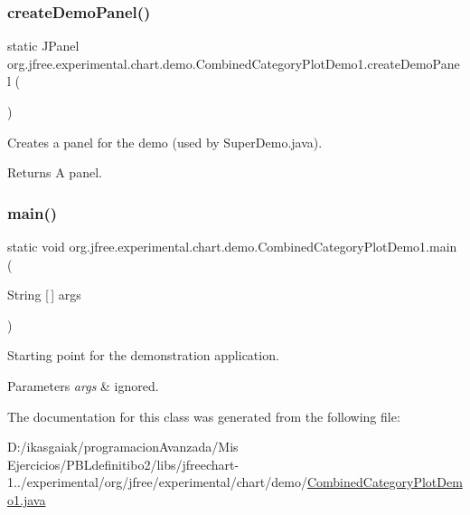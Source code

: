 \subsubsection{\texorpdfstring{create\+Demo\+Panel()}{createDemoPanel()}}
{\footnotesize\ttfamily static J\+Panel org.\+jfree.\+experimental.\+chart.\+demo.\+Combined\+Category\+Plot\+Demo1.\+create\+Demo\+Panel (\begin{DoxyParamCaption}{ }\end{DoxyParamCaption})\hspace{0.3cm}{\ttfamily [static]}}

Creates a panel for the demo (used by Super\+Demo.\+java).

\begin{DoxyReturn}{Returns}
A panel. 
\end{DoxyReturn}
\mbox{\label{classorg_1_1jfree_1_1experimental_1_1chart_1_1demo_1_1_combined_category_plot_demo1_a33b6308c6534361593cba600b400c098}} 
\subsubsection{\texorpdfstring{main()}{main()}}
{\footnotesize\ttfamily static void org.\+jfree.\+experimental.\+chart.\+demo.\+Combined\+Category\+Plot\+Demo1.\+main (\begin{DoxyParamCaption}\item[{String \mbox{[}$\,$\mbox{]}}]{args }\end{DoxyParamCaption})\hspace{0.3cm}{\ttfamily [static]}}

Starting point for the demonstration application.


\begin{DoxyParams}{Parameters}
{\em args} & ignored. \\
\hline
\end{DoxyParams}


The documentation for this class was generated from the following file\+:\begin{DoxyCompactItemize}
\item 
D\+:/ikasgaiak/programacion\+Avanzada/\+Mis Ejercicios/\+P\+B\+Ldefinitibo2/libs/jfreechart-\/1../experimental/org/jfree/experimental/chart/demo/\mbox{\hyperlink{_combined_category_plot_demo1_8java}{Combined\+Category\+Plot\+Demo1.\+java}}\end{DoxyCompactItemize}

